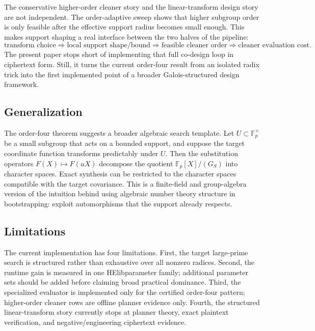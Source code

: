 \documentclass[a4paper,runningheads]{llncs}
\newcommand{\Fp}{\mathbb{F}_p}
\newcommand{\HElib}{\textsf{HElib}}
\begin{document}
The conservative higher-order cleaner story and the linear-transform design
story are not independent. The order-adaptive sweep shows that higher subgroup
order is only feasible after the effective support radius becomes small enough.
This makes support shaping a real interface between the two halves of the
pipeline:
\[
  \text{transform choice} \Rightarrow \text{local support shape/bound}
  \Rightarrow \text{feasible cleaner order} \Rightarrow \text{cleaner evaluation cost}.
\]
The present paper stops short of implementing that full co-design loop in
ciphertext form. Still, it turns the current order-four result from an isolated
radix trick into the first implemented point of a broader Galois-structured
design framework.

\subsection{Generalization}

The order-four theorem suggests a broader algebraic search template. Let
$U\subset\Fp^\times$ be a small subgroup that acts on a bounded support, and
suppose the target coordinate function transforms predictably under $U$. Then
the substitution operators $F(X)\mapsto F(uX)$ decompose the quotient
$\Fp[X]/(G_S)$ into character spaces. Exact synthesis can be restricted to the
character spaces compatible with the target covariance. This is a finite-field
and group-algebra version of the intuition behind using algebraic number theory
structure in bootstrapping: exploit automorphisms that the support already
respects.

\subsection{Limitations}

The current implementation has four limitations. First, the target large-prime
search is structured rather than exhaustive over all nonzero radices. Second,
the runtime gain is measured in one \HElib parameter family; additional
parameter sets should be added before claiming broad practical dominance. Third,
the specialized evaluator is implemented only for the certified order-four
pattern; higher-order cleaner rows are offline planner evidence only. Fourth,
the structured linear-transform story currently stops at planner theory, exact
plaintext verification, and negative/engineering ciphertext evidence.

\end{document}
